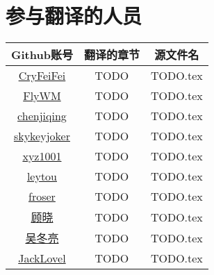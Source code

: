 \chapter{参与翻译的人员}


\centering
\begin{tabular}{ccc}
	\toprule
	\cmidrule{1-3}
	 Github账号 & 翻译的章节 & 源文件名 \\
	\midrule
	\href{https://github.com/CryFeiFei}{CryFeiFei} & TODO & TODO.tex  \\
	\href{https://github.com/FlyWM}{FlyWM}  & TODO & TODO.tex \\
	\href{https://github.com/chenjiqing}{chenjiqing}  & TODO & TODO.tex \\	
	\href{https://github.com/skykeyjoker}{skykeyjoker}  & TODO & TODO.tex \\	
	\href{https://github.com/xyz1001}{xyz1001}  & TODO & TODO.tex \\	
	\href{https://github.com/leytou}{leytou}  & TODO & TODO.tex \\	
	\href{https://github.com/froser}{froser}  & TODO & TODO.tex \\	
	\href{https://github.com/chenyanzz}{顾晓}  & TODO & TODO.tex \\
    \href{https://github.com/abc881858}{吴冬亮}  & TODO & TODO.tex \\	
	\href{https://github.com/JackLovel}{JackLovel}  & TODO & TODO.tex \\
	\bottomrule
\end{tabular}

